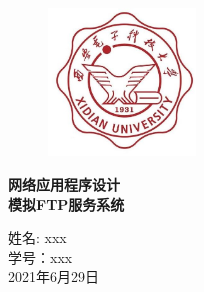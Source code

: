 \documentclass{article}
\begin{document}
\pagestyle{empty}
\begin{figure}
    \centering
    \includegraphics[width=0.35\textwidth]{xdu.jpeg}
\end{figure}

\begin{spacing}{4.0}
    \centering
    \textbf{\Huge 网络应用程序设计 \\ \LARGE 模拟FTP服务系统}
\end{spacing}

\begin{spacing}{2.5}
    \centering
    \Large 姓名: xxx \\ 学号：xxx  \\ 2021年6月29日
\end{spacing}
\newpage 

\setcounter{secnumdepth}{4} 
\setcounter{tocdepth}{4}  
\begin{spacing}{2.0}
    \tableofcontents
\end{spacing}
\newpage
\end{document}
